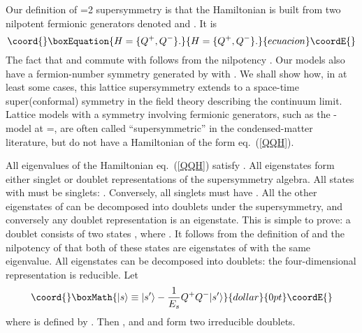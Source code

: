 \documentclass[a4paper,prl,aps,twocolumn]{revtex4}
\begin{document}
Our definition of \coordHE{}=2 supersymmetry is that
the Hamiltonian \coordHE{} is built from
two nilpotent fermionic generators denoted 
\coordHE{} and \coordHE{} \cite{Witten}. It is
\begin{equation}\coord{}\boxEquation{H=\{Q^+,Q^-\}.
\label{QQH}  
}{H=\{Q^+,Q^-\}.
}{ecuacion}\coordE{}\end{equation}
The fact that \coordHE{} and \coordHE{} commute with \coordHE{}
follows from the nilpotency \coordHE{}.
Our models also have a
fermion-number symmetry generated by \coordHE{} with \coordHE{}.  We shall show how, in at least some cases, this lattice
supersymmetry extends to a space-time super(conformal) symmetry in the
field theory describing the continuum limit. Lattice
models with a symmetry involving fermionic generators, such as the
\coordHE{}-\coordHE{} model at \coordHE{}=\coordHE{}, are often called ``supersymmetric'' in
the condensed-matter literature, but do not have a Hamiltonian of the
form eq.~(\ref{QQH}).

All eigenvalues \coordHE{} of the Hamiltonian eq.~(\ref{QQH}) satisfy
\coordHE{}. All eigenstates form either singlet or doublet representations  
of the supersymmetry algebra.  All states \coordHE{} with \coordHE{} must  
be singlets: \coordHE{} \cite{Witten}.  Conversely,  
all singlets must have \coordHE{}.  All the other eigenstates of \coordHE{} can be  
decomposed into doublets under the supersymmetry, and conversely any  
doublet representation is an eigenstate. This is simple to prove: a  
doublet consists of two states \coordHE{}, where  
\coordHE{}. It follows from the definition of \coordHE{} and the  
nilpotency of \coordHE{} that both of these states are eigenstates of \coordHE{}  
with the same eigenvalue. All eigenstates can be decomposed into  
doublets:  the four-dimensional  
representation \coordHE{}
is reducible. Let
$$\coord{}\boxMath{|s\rangle\equiv |s'\rangle -\frac{1}{E_s} Q^+Q^-|s'\rangle}{dollar}{0pt}\coordE{}$$
where \coordHE{} is defined by \coordHE{}. Then
\coordHE{}, and \coordHE{} and
\coordHE{} form two irreducible doublets.
  
\end{document}
